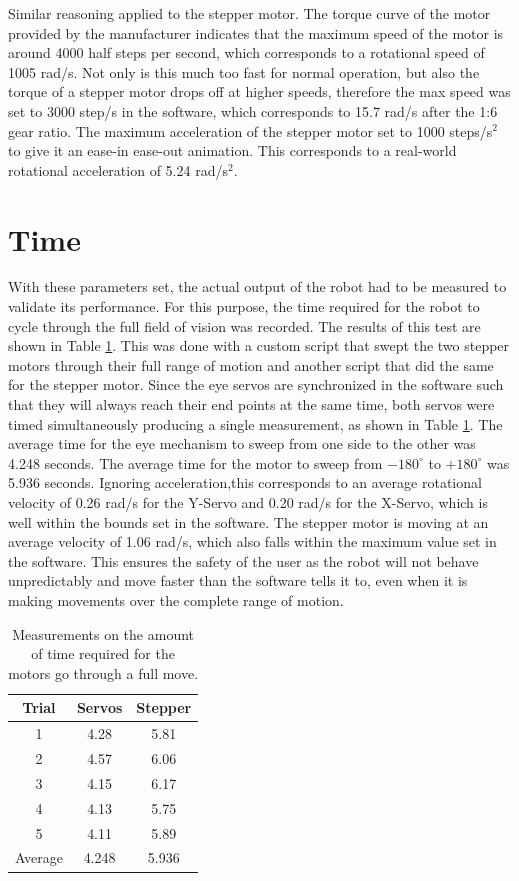 Similar reasoning applied to the stepper motor. The torque curve of the motor provided by the manufacturer indicates that the maximum speed of the motor is around 4000 half steps per second, which corresponds to a rotational speed of 1005 rad/s. Not only is this much too fast for normal operation, but also the torque of a stepper motor drops off at higher speeds, therefore the max speed was set to 3000 step/s in the software, which corresponds to 15.7 rad/s after the 1:6 gear ratio. The maximum acceleration of the stepper motor set to 1000 steps/s$^2$ to give it an ease-in ease-out animation. This corresponds to a real-world rotational acceleration of 5.24 rad/s$^2$.

\section{Time}
\label{ch:time}
With these parameters set, the actual output of the robot had to be measured to validate its performance. For this purpose, the time required for the robot to cycle through the full field of vision was recorded. The results of this test are shown in Table \ref{full-move-times}. This was done with a custom script that swept the two stepper motors through their full range of motion and another script that did the same for the stepper motor. Since the eye servos are synchronized in the software such that they will always reach their end points at the same time, both servos were timed simultaneously producing a single measurement, as shown in Table \ref{full-move-times}. The average time for the eye mechanism to sweep from one side to the other was 4.248 seconds. The average time for the motor to sweep from $-180^\circ$ to $+180^\circ$ was 5.936 seconds. Ignoring acceleration,this corresponds to an average rotational velocity of 0.26 rad/s for the Y-Servo and 0.20 rad/s for the X-Servo, which is well within the bounds set in the software. The stepper motor is moving at an average velocity of 1.06 rad/s, which also falls within the maximum value set in the software. This ensures the safety of the user as the robot will not behave unpredictably and move faster than the software tells it to, even when it is making movements over the complete range of motion.

\begin{table}[h]
    \centering
    \begin{tabular}{c|c|c}
    Trial & Servos & Stepper \\
    \hline
    1&4.28&5.81 \\
    2&4.57&6.06\\
    3&4.15&6.17\\
    4&4.13&5.75\\
    5&4.11&5.89\\
    \hline
    Average&4.248&5.936
    \end{tabular}
     \caption{Measurements on the amount of time required for the motors go through a full move.}
     \label{full-move-times}
\end{table}


